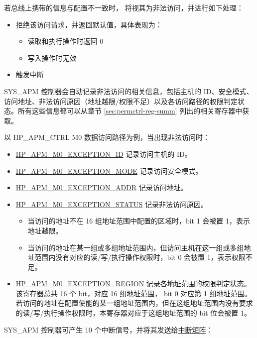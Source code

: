 \documentclass[main\_\_CN.tex]{subfiles}
\begin{document}
若总线上携带的信息与配置不一致时，\chipname{} 将视其为非法访问，并进行如下处理：

\begin{itemize}
    \item 拒绝该访问请求，并返回默认值，具体表现为：
    \begin{itemize}
        \item 读取和执行操作时返回 0
        \item 写入操作时无效
    \end{itemize}
    \item 触发中断
\end{itemize}

SYS\_APM 控制器会自动记录非法访问的相关信息，包括主机的 ID、安全模式、访问地址、非法访问原因（地址越限/权限不足）以及各访问路径的权限判定状态。所有这些信息都可以从章节 \ref{sec:permctrl-reg-summ}  列出的相关寄存器中获取。

以 HP\_APM\_CTRL M0 数据访问路径为例，当出现非法访问时：

\begin{itemize}
    \item \hyperref[fielddesc:HPAPMM0EXCEPTIONID]{HP\_APM\_M0\_EXCEPTION\_ID} 记录访问主机的 ID。
    \item \hyperref[fielddesc:HPAPMM0EXCEPTIONMODE]{HP\_APM\_M0\_EXCEPTION\_MODE} 记录访问安全模式。
    \item \hyperref[fielddesc:HPAPMM0EXCEPTIONADDR]{HP\_APM\_M0\_EXCEPTION\_ADDR} 记录访问地址。
    \item \hyperref[fielddesc:HPAPMM0EXCEPTIONSTATUS]{HP\_APM\_M0\_EXCEPTION\_STATUS} 记录非法访问原因。
    \begin{itemize}
        \item  当访问的地址不在 16 组地址范围中配置的区域时，bit 1 会被置 1，表示地址越限。
        \item  当访问的地址在某一组或多组地址范围内，但访问主机在这一组或多组地址范围内没有对应的读/写/执行操作权限时，bit 0 会被置 1，表示权限不足。
    \end{itemize}
    \item \hyperref[fielddesc:HPAPMM0EXCEPTIONREGION]{HP\_APM\_M0\_EXCEPTION\_REGION} 记录各地址范围的权限判定状态。该寄存器总共 16 个 bit，对应 16 组地址范围， bit 0 对应第 1 组地址范围。若访问的地址在配置使能的某一组地址范围内，但在这组地址范围内没有要求的读/写/执行操作权限时，本寄存器对应于这组地址范围的 bit 位会被置 1。
\end{itemize}

SYS\_APM 控制器可产生 10 个中断信号，并将其发送给\hyperref[mod:intmtrx]{中断矩阵}：
\end{document}
